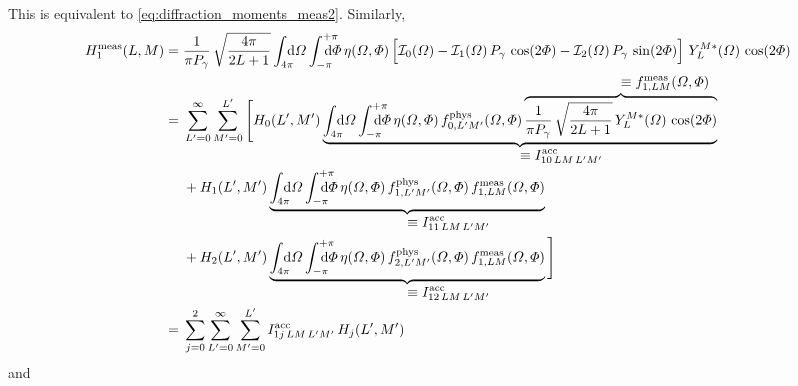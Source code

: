 This is equivalent to \cref{eq:diffraction_moments_meas2}.  Similarly,
\begin{align}
  H_1^\text{meas}(L, M)
  ={}& \frac{1}{\pi P_\gamma}\, \sqrt{\frac{4 \pi}{2 L + 1}} \int_{4 \pi}\!\!\!\! \dif{\Omega} \int_{-\pi}^{+\pi}\hspace{-1.2em} \dif{\Phi}\,
  \eta(\Omega, \Phi) \sBrk[2]{\intensity_0(\Omega)
  - \intensity_1(\Omega)\, P_\gamma\, \cos(2 \Phi)
  - \intensity_2(\Omega)\, P_\gamma\, \sin(2 \Phi)}\,
  Y_L^{M *}(\Omega)\, \cos(2 \Phi) \nonumber
  \\
  ={}& \sum_{L' = 0}^\infty \sum_{M' = 0}^{L'} \Bigg[
  H_0(L', M')\,
  \rdUnderbrace{\int_{4 \pi}\!\!\!\! \dif{\Omega} \int_{-\pi}^{+\pi}\hspace{-1.2em} \dif{\Phi}\,
  \eta(\Omega, \Phi)\,
  f_{0, L' M'}^\text{phys}(\Omega, \Phi)\,
  \rdOverbrace{\frac{1}{\pi P_\gamma}\, \sqrt{\frac{4 \pi}{2 L + 1}}\, Y_L^{M *}(\Omega)\, \cos(2 \Phi)}{\equiv f_{1, L M}^\text{meas}(\Omega, \Phi)}}%
  {\equiv I^\text{acc}_{1 0\, L M\, L' M'}} \nonumber
  \\
  & + H_1(L', M')\,
  \rdUnderbrace{\int_{4 \pi}\!\!\!\! \dif{\Omega} \int_{-\pi}^{+\pi}\hspace{-1.2em} \dif{\Phi}\,
  \eta(\Omega, \Phi)\,
  f_{1, L' M'}^\text{phys}(\Omega, \Phi)\,
  f_{1, L M}^\text{meas}(\Omega, \Phi)}%
  {\equiv I^\text{acc}_{1 1\, L M\, L' M'}} \nonumber
  \\
  & + H_2(L', M')\,
  \rdUnderbrace{\int_{4 \pi}\!\!\!\! \dif{\Omega} \int_{-\pi}^{+\pi}\hspace{-1.2em} \dif{\Phi}\,
  \eta(\Omega, \Phi)\,
  f_{2, L' M'}^\text{phys}(\Omega, \Phi)\,
  f_{1, L M}^\text{meas}(\Omega, \Phi)}%
  {\equiv I^\text{acc}_{1 2\, L M\, L' M'}}\, \Bigg] \nonumber
  \\
  \label{eq:photoprod_moment_1_meas2}
  ={}& \sum_{j = 0}^2 \sum_{L' = 0}^\infty \sum_{M' = 0}^{L'}
  I^\text{acc}_{1 j\, L M\, L' M'}\, H_j(L', M')
\end{align}
and
